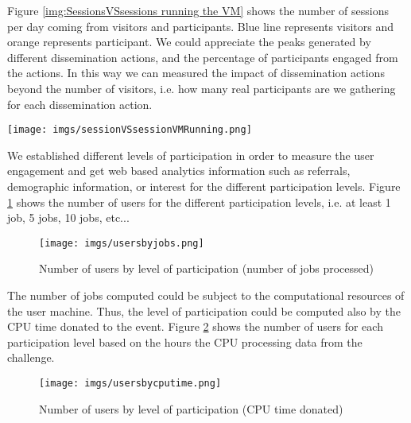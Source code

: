 \documentclass{article}
\begin{document}
Figure \ref{img:SessionsVSsessions running the VM} shows the number of sessions per day coming from visitors and participants. Blue line represents visitors and orange represents  participant. We could appreciate the peaks generated by different dissemination actions, and the percentage of participants engaged from the actions. In this way we can measured the impact of dissemination actions beyond the number of visitors, i.e. how many real participants are we gathering for each dissemination action.  


\begin{figure*}[th]
  \begin{center}
		\texttt{[image: imgs/sessionVSsessionVMRunning.png]}
  \end{center}
\caption{Sessions of users not running the VM versus sessions running the VM}
\label{img:SessionsVSsessions running the VM}
\end{figure*}



We established different levels of participation in order to measure the user engagement and get web based analytics information such as referrals, demographic information, or interest for the different participation levels. Figure \ref{img:usersbyjobs} shows the number of users for the different participation levels, i.e. at least 1 job, 5 jobs, 10 jobs, etc...



\begin{figure}[t]
  \begin{center}
		\texttt{[image: imgs/usersbyjobs.png]}
  \end{center}
\caption{Number of users by level of participation (number of jobs processed)}
\label{img:usersbyjobs}
\end{figure}


The number of jobs computed could be subject to the computational resources of the user machine. Thus, the level of participation could be computed also by the CPU time donated to the event. Figure \ref{img:usersbycputime} shows the number of users for each participation level based on the hours the CPU processing data from the challenge. 

\begin{figure}[t]
  \begin{center}
		\texttt{[image: imgs/usersbycputime.png]}
  \end{center}
\caption{Number of users by level of participation (CPU time donated)}
\label{img:usersbycputime}
\end{figure}
\end{document}
